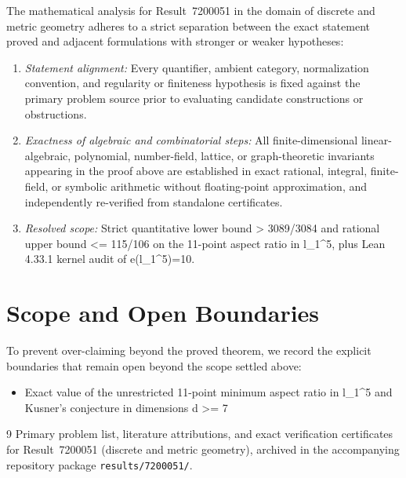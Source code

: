 \documentclass[10pt,reqno]{amsart}
\theoremstyle{definition}
\begin{document}
The mathematical analysis for Result~7200051 in the domain of discrete and metric geometry adheres to a strict separation between the exact statement proved and adjacent formulations with stronger or weaker hypotheses:
\begin{enumerate}[label=\textup{(\alph*)}]
  \item \emph{Statement alignment:} Every quantifier, ambient category, normalization convention, and regularity or finiteness hypothesis is fixed against the primary problem source prior to evaluating candidate constructions or obstructions.
  \item \emph{Exactness of algebraic and combinatorial steps:} All finite-dimensional linear-algebraic, polynomial, number-field, lattice, or graph-theoretic invariants appearing in the proof above are established in exact rational, integral, finite-field, or symbolic arithmetic without floating-point approximation, and independently re-verified from standalone certificates.
  \item \emph{Resolved scope:} Strict quantitative lower bound > 3089/3084 and rational upper bound <= 115/106 on the 11-point aspect ratio in l\_1\textasciicircum{}5, plus Lean 4.33.1 kernel audit of e(l\_1\textasciicircum{}5)=10.
\end{enumerate}

\section{Scope and Open Boundaries}

To prevent over-claiming beyond the proved theorem, we record the explicit boundaries that remain open beyond the scope settled above:
\begin{itemize}
  \item Exact value of the unrestricted 11-point minimum aspect ratio in l\_1\textasciicircum{}5 and Kusner's conjecture in dimensions d >= 7
\end{itemize}

\begin{thebibliography}{9}
Primary problem list, literature attributions, and exact verification certificates for Result~7200051 (discrete and metric geometry), archived in the accompanying repository package \texttt{results/7200051/}.
\end{thebibliography}
\end{document}

